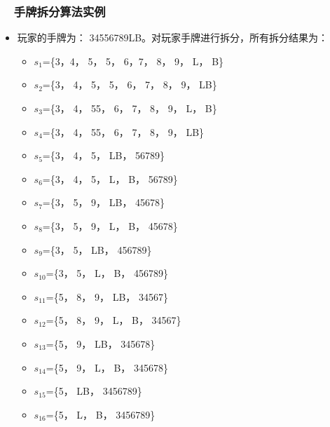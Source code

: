 \documentclass[9pt, CJK]{beamer}
\begin{document}
	\begin{frame}
		\frametitle{~~手牌拆分算法实例}
		\begin{itemize}
			\item 玩家的手牌为： 34556789LB。对玩家手牌进行拆分，所有拆分结果为：
			\begin{itemize}
				\item<2-> $s_1$=\{3，4， 5， 5， 6，7， 8， 9， L， B\}
				\item<2-> $s_2$=\{3， 4， 5， 5， 6， 7， 8， 9， LB\}
				\item<2-> $s_3$=\{3， 4， 55， 6， 7， 8， 9， L， B\}
				\item<2-> $s_4$=\{3， 4， 55， 6， 7， 8， 9， LB\}
				\item<2-> $s_5$=\{3， 4， 5， LB， 56789\}
				\item<2-> $s_6$=\{3， 4， 5， L， B， 56789\}
				\item<2-> $s_7$=\{3， 5， 9， LB， 45678\}
				\item<2-> $s_8$=\{3， 5， 9， L， B， 45678\}
				\item<2-> $s_9$=\{3， 5， LB， 456789\}
				\item<2-> $s_{10}$=\{3， 5， L， B， 456789\}
				\item<2-> $s_{11}$=\{5， 8， 9， LB， 34567\}
				\item<2-> $s_{12}$=\{5， 8， 9， L， B， 34567\}
				\item<2-> $s_{13}$=\{5， 9， LB， 345678\}
				\item<2-> $s_{14}$=\{5， 9， L， B， 345678\}
				\item<2-> $s_{15}$=\{5， LB， 3456789\}
				\item<2-> $s_{16}$=\{5， L， B， 3456789\}
			\end{itemize}
		\end{itemize}
	\end{frame}
	
\end{document}
